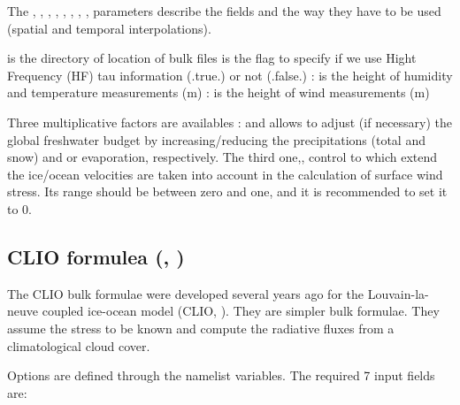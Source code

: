 \documentclass[../tex_main/NEMO_manual]{subfiles}
\begin{document}
The , , , , , ,
, ,  parameters describe the fields 
and the way they have to be used (spatial and temporal interpolations). 

 is the directory of location of bulk files
 is the flag to specify if we use Hight Frequency (HF) tau information (.true.) or not (.false.)
: is the height of humidity and temperature measurements (m)
: is the height of wind measurements (m)

Three multiplicative factors are availables : 
 and  allows to adjust (if necessary) the global freshwater budget 
by increasing/reducing the precipitations (total and snow) and or evaporation, respectively.
The third one,, control to which extend the ice/ocean velocities are taken into account 
in the calculation of surface wind stress. Its range should be between zero and one, 
and it is recommended to set it to 0.

\subsection{CLIO formulea (\protect{}, \protect{})}
\label{subsec:SBC_blk_clio}
%

The CLIO bulk formulae were developed several years ago for the 
Louvain-la-neuve coupled ice-ocean model (CLIO, \cite{Goosse_al_JGR99}). 
They are simpler bulk formulae. They assume the stress to be known and 
compute the radiative fluxes from a climatological cloud cover. 

Options are defined through the   namelist variables.
The required 7 input fields are:
\end{document}

